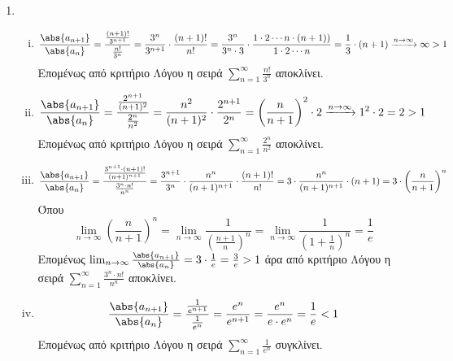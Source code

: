 \begin{enumerate}
\item 
    \begin{enumerate}[i)]
        \item 
            \[
                \frac{\abs{a_{n+1}}}{\abs{a_{n}}} = 
                \frac{\frac{(n+1)!}{3^{n+1}}}{\frac{n!}{3^{n}}} = 
                \frac{3^{n}}{3^{n+1}} \cdot
                \frac{(n+1)!}{n!} = \frac{3^{n}}{3^{n}\cdot 3} \cdot \frac{1 \cdot 2 
                \cdots n \cdot (n+1))}{1 \cdot 2 \cdots n} = \frac{1}{3} \cdot (n+1) 
                \xrightarrow{n \to \infty} \infty > 1
            \] 
            Επομένως από κριτήριο Λόγου η σειρά $ \sum_{n=1}^{\infty} 
            \frac{n!}{3^{n}}$ αποκλίνει. 

        \item 
            \[
                \frac{\abs{a_{n+1}}}{\abs{a_{n}}} = \frac{\frac{2^{n+1}}{(n+1)^{2}}}{
                \frac{2^{n}}{n^{2}}} = \frac{n^{2}}{(n+1)^{2}} \cdot 
                \frac{2^{n+1}}{2^{n}} =  \left(\frac{n}{n+1}\right)^{2} \cdot 2 
                \xrightarrow{n \to \infty} 1^{2}\cdot 2 = 2 > 1 
            \] 
            Επομένως από κριτήριο Λόγου η σειρά $ \sum_{n=1}^{\infty} 
            \frac{2^{n}}{n^{2}} $ αποκλίνει.

        \item 
            \[
                \frac{\abs{a_{n+1}}}{\abs{a_{n}}} = \frac{\frac{3^{n+1}\cdot (n+1)!}
                {(n+1)^{n+1}}}{\frac{3^{n}\cdot n!}{n^{n}}} = \frac{3^{n+1}}{3^{n}} 
                \cdot \frac{n^{n}}{(n+1)^{n+1}} \cdot \frac{(n+1)!}{n!} = 3 \cdot 
                \frac{n^{n}}{(n+1)^{n+1}} \cdot (n+1) = 3 \cdot \left(\frac{n}{n+1} 
                \right)^{n} 
            \] 
            Όπου 
            \[
                \lim_{n \to \infty} \left(\frac{n}{n+1} \right)^{n} = 
                \lim_{n \to \infty}\frac{1}{\left(\frac{n+1}{n}\right)^{n}} = 
                \lim_{n \to \infty} \frac{1}{(1 + \frac{1}{n})^{n}} = \frac{1}{e}
            \]
            Επομένως $ \lim_{n \to \infty} \frac{\abs{a_{n+1}}}{\abs{a_{n}}} = 
            3 \cdot \frac{1}{e} = \frac{3}{e} > 1$ άρα από κριτήριο Λόγου η σειρά 
            $ \sum_{n=1}^{\infty} \frac{3^{n}\cdot n!}{n^{n}} $ αποκλίνει.

        \item 
            \[
                \frac{\abs{a_{n+1}}}{\abs{a_{n}}} = 
                \frac{\frac{1}{e^{n+1}}}{\frac{1}{e^{n}}} =
                \frac{e^{n}}{e^{n+1}} = \frac{e^{n}}{e\cdot e^{n}} = \frac{1}{e} <1  
            \] 
            Επομένως από κριτήριο Λόγου η σειρά $ \sum_{n=1}^{\infty} \frac{1}{e^{n}} $
            συγκλίνει.


\end{enumerate}
\end{enumerate}
